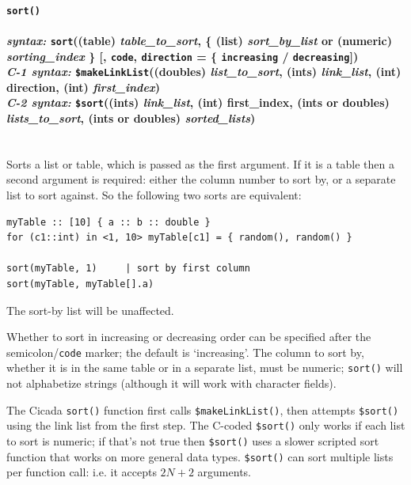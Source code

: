 \documentclass{article}
\newenvironment{code}{
       \begin{list}{}{
               \setlength{\leftmargin}{.4in}
               \setlength{\rightmargin}{0in}
               \setlength{\topsep}{.2in}
       }
       \small
       \item[] }
       { \end{list}   }
\begin{document}
\paragraph{\texttt{sort()}\\\\
\normalfont \emph{syntax: } \texttt{sort}((table) \emph{table\_to\_sort}, \{ (list) \emph{sort\_by\_list} or (numeric) \emph{sorting\_index} \} [, \texttt{code}, \texttt{direction} = \{ \texttt{increasing} / \texttt{decreasing}])\\
\normalfont \emph{C-1 syntax: } \texttt{\$makeLinkList}((doubles) \emph{list\_to\_sort}, (ints) \emph{link\_list}, (int) direction, (int) \emph{first\_index})\\
\normalfont \emph{C-2 syntax: } \texttt{\$sort}((ints) \emph{link\_list}, (int) first\_index, (ints or doubles) \emph{lists\_to\_sort}, (ints or doubles) \emph{sorted\_lists})\\\\}

Sorts a list or table, which is passed as the first argument.  If it is a table then a second argument is required: either the column number to sort by, or a separate list to sort against.  So the following two sorts are equivalent:

\begin{code} \begin{verbatim}
myTable :: [10] { a :: b :: double }
for (c1::int) in <1, 10> myTable[c1] = { random(), random() }

sort(myTable, 1)     | sort by first column
sort(myTable, myTable[].a)
\end{verbatim} \end{code}

\noindent The sort-by list will be unaffected.

Whether to sort in increasing or decreasing order can be specified after the semicolon/\verb#code# marker; the default is `increasing'.  The column to sort by, whether it is in the same table or in a separate list, must be numeric; \verb#sort()# will not alphabetize strings (although it will work with character fields).

The Cicada \verb#sort()# function first calls \verb#$makeLinkList()#, then attempts \verb#$sort()# using the link list from the first step.  The C-coded \verb#$sort()# only works if each list to sort is numeric; if that's not true then \verb#$sort()# uses a slower scripted sort function that works on more general data types.  \verb#$sort()# can sort multiple lists per function call: i.e. it accepts $2N+2$ arguments.
\\\\
\end{document}
